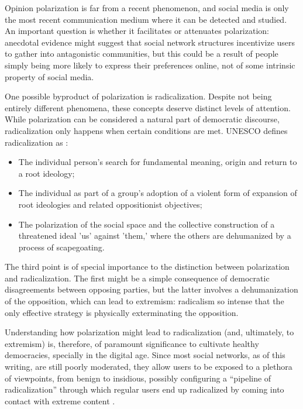 Opinion polarization is far from a recent phenomenon, and social media is only
the most recent communication medium where it can be detected and studied. An
important question is whether it facilitates or attenuates polarization:
anecdotal evidence might suggest that social network structures incentivize
users to gather into antagonistic communities, but this could be a result of
people simply being more likely to express their preferences online, not of some
intrinsic property of social media.

One possible byproduct of polarization is radicalization. Despite not being
entirely different phenomena, these concepts deserve distinct levels of
attention. While polarization can be considered a natural part of democratic
discourse, radicalization only happens when certain conditions are met. UNESCO
defines radicalization as \citep{seraphin_youth_2017}:

\begin{itemize}
  \item The individual person's search for fundamental meaning, origin and
        return to a root ideology;
  \item The individual as part of a group's adoption of a violent form of
        expansion of root ideologies and related oppositionist objectives;
  \item The polarization of the social space and the collective construction of
        a threatened ideal 'us' against 'them,' where the others are dehumanized
        by a process of scapegoating.
\end{itemize}

The third point is of special importance to the distinction between polarization
and radicalization. The first might be a simple consequence of democratic
disagreements between opposing parties, but the latter involves a dehumanization
of the opposition, which can lead to extremism: radicalism so intense that the
only effective strategy is physically exterminating the opposition.

Understanding how polarization might lead to radicalization (and, ultimately, to
extremism) is, therefore, of paramount significance to cultivate healthy
democracies, specially in the digital age. Since most social networks, as of
this writing, are still poorly moderated, they allow users to be exposed to a
plethora of viewpoints, from benign to insidious, possibly configuring a
``pipeline of radicalization'' through which regular users end up radicalized by
coming into contact with extreme content \citep{ribeiro_auditing_2020}.

